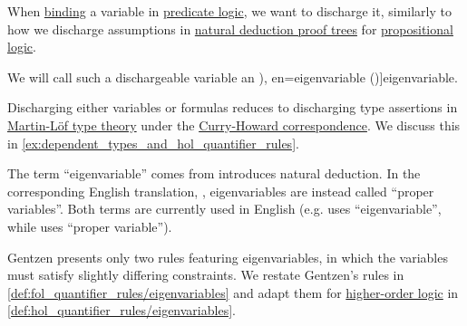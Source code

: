\begin{concept}\label{con:eigenvariable}
  When \hyperref[con:variable_binding]{binding} a variable in \hyperref[rem:predicate_logic]{predicate logic}, we want to discharge it, similarly to how we discharge assumptions in \hyperref[def:propositional_natural_deduction_proof_tree]{natural deduction proof trees} for \hyperref[def:propositional_logic]{propositional logic}.

  We will call such a dischargeable variable an \term[ru=собственная переменная (\cite[101]{Герасимов2011Вычислимость}), en=eigenvariable (\cite[\S 5.1.10]{Mimram2020ProgramEqualsProof})]{eigenvariable}.
\end{concept}
\begin{comments}
  \item Discharging either variables or formulas reduces to discharging type assertions in \hyperref[def:martin_lof_type_theory]{Martin-L\"of type theory} under the \hyperref[con:curry_howard_correspondence]{Curry-Howard correspondence}. We discuss this in \cref{ex:dependent_types_and_hol_quantifier_rules}.

  \item The term \enquote{eigenvariable} comes from  introduces natural deduction. In the corresponding English translation, \cite[293]{Gentzen1964LogicalDeduction}, eigenvariables are instead called \enquote{proper variables}. Both terms are currently used in English (e.g.  uses \enquote{eigenvariable}, while  uses \enquote{proper variable}).

  Gentzen presents only two rules featuring eigenvariables, in which the variables must satisfy slightly differing constraints. We restate Gentzen's rules in \cref{def:fol_quantifier_rules/eigenvariables} and adapt them for \hyperref[def:higher_order_logic]{higher-order logic} in \cref{def:hol_quantifier_rules/eigenvariables}.
\end{comments}

